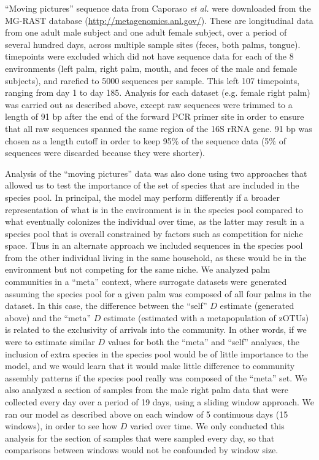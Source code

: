 \documentclass{article}
\begin{document}
\par
“Moving pictures” sequence data from Caporaso \emph{et al.} \cite{Caporaso2011} were downloaded from the MG-RAST database (\url{http://metagenomics.anl.gov/}). These are longitudinal data from one adult male subject and one adult female subject, over a period of several hundred days, across multiple sample sites (feces, both palms, tongue). timepoints were excluded which did not have sequence data for each of the 8 environments (left palm, right palm, mouth, and feces of the male and female subjects), and rarefied to 5000 sequences per sample. This left 107 timepoints, ranging from day 1 to day 185. Analysis for each dataset (e.g. female right palm) was carried out as described above, except raw sequences were trimmed to a length of 91 bp after the end of the forward PCR primer site in order to ensure that all raw sequences spanned the same region of the 16S rRNA gene. 91 bp was chosen as a length cutoff in order to keep 95\% of the sequence data (5\% of sequences were discarded because they were shorter).
\par
Analysis of the “moving pictures” data was also done using two approaches that allowed us to test the importance of the set of species that are included in the species pool. In principal, the model may perform differently if a broader representation of what is in the environment is in the species pool compared to what eventually colonizes the individual over time, as the latter may result in a species pool that is overall constrained by factors such as competition for niche space. Thus in an alternate approach we included sequences in the species pool from the other individual living in the same household, as these would be in the environment but not competing for the same niche. We analyzed palm communities in a “meta” context, where surrogate datasets were generated assuming the species pool for a given palm was composed of all four palms in the dataset. In this case, the difference between the “self” \(D\) estimate (generated above) and the “meta” \(D\) estimate (estimated with a metapopulation of zOTUs) is related to the exclusivity of arrivals into the community. In other words, if we were to estimate similar \(D\) values for both the “meta” and “self” analyses, the inclusion of extra species in the species pool would be of little importance to the model, and we would learn that it would make little difference to community assembly patterns if the species pool really was composed of the “meta” set. We also analyzed a section of samples from the male right palm data that were collected every day over a period of 19 days, using a sliding window approach. We ran our model as described above on each window of 5 continuous days (15 windows), in order to see how \(D\) varied over time. We only conducted this analysis for the section of samples that were sampled every day, so that comparisons between windows would not be confounded by window size.
\end{document}
